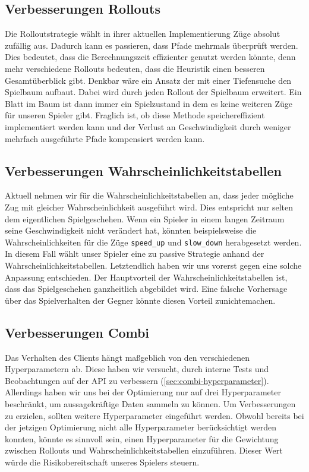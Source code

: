 \documentclass[12pt,a4paper]{article}
\begin{document}
\subsection{Verbesserungen Rollouts}
Die Rolloutstrategie wählt in ihrer aktuellen Implementierung Züge absolut zufällig aus. Dadurch kann es passieren, dass Pfade mehrmals überprüft werden. Dies bedeutet, dass die Berechnungszeit effizienter genutzt werden könnte, denn mehr verschiedene Rollouts bedeuten, dass die Heuristik einen besseren Gesamtüberblick gibt. Denkbar wäre ein Ansatz der mit einer Tiefensuche den Spielbaum aufbaut. Dabei wird durch jeden Rollout der Spielbaum erweitert. Ein Blatt im Baum ist dann immer ein Spielzustand in dem es keine weiteren Züge für unseren Spieler gibt. Fraglich ist, ob diese Methode speichereffizient implementiert werden kann und der Verlust an Geschwindigkeit durch weniger mehrfach ausgeführte Pfade kompensiert werden kann.

\subsection{Verbesserungen Wahrscheinlichkeitstabellen}
Aktuell nehmen wir für die Wahrscheinlichkeitstabellen an, dass jeder mögliche Zug mit gleicher Wahrscheinlichkeit ausgeführt wird. Dies entspricht nur selten dem eigentlichen Spielgeschehen. Wenn ein Spieler in einem langen Zeitraum seine Geschwindigkeit nicht verändert hat, könnten beispielsweise die Wahrscheinlichkeiten für die Züge \texttt{speed\_up} und \texttt{slow\_down} herabgesetzt werden. In diesem Fall wählt unser Spieler eine zu passive Strategie anhand der Wahrscheinlichkeitstabellen. Letztendlich haben wir uns vorerst gegen eine solche Anpassung entschieden. Der Hauptvorteil der Wahrscheinlichkeitstabellen ist, dass das Spielgeschehen ganzheitlich abgebildet wird. Eine falsche Vorhersage über das Spielverhalten der Gegner könnte diesen Vorteil zunichtemachen.

\subsection{Verbesserungen Combi}
Das Verhalten des Clients hängt maßgeblich von den verschiedenen Hyperparametern ab. Diese haben wir versucht, durch interne Tests und Beobachtungen auf der API zu verbessern (\ref{sec:combi-hyperparameter}). Allerdings haben wir uns bei der Optimierung nur auf drei Hyperparameter beschränkt, um aussagekräftige Daten sammeln zu können. Um Verbesserungen zu erzielen, sollten weitere Hyperparameter eingeführt werden. Obwohl bereits bei der jetzigen Optimierung nicht alle Hyperparameter berücksichtigt werden konnten, könnte es sinnvoll sein, einen Hyperparameter für die Gewichtung zwischen Rollouts und Wahrscheinlichkeitstabellen einzuführen. Dieser Wert würde die Risikobereitschaft unseres Spielers steuern.
\end{document}
